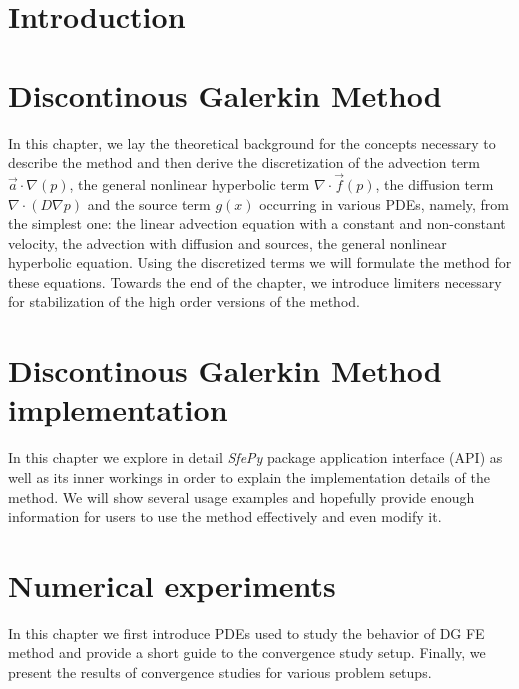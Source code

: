 \documentclass[openany]{book}
\providecommand{\sfepy}{\textit{SfePy}}
\theoremstyle{definition}
\numberwithin{equation}{section}
\numberwithin{table}{section}
\begin{document}
\chapter{Introduction}
\label{ch:introduction}


\chapter{Discontinous Galerkin Method}
\label{ch:theory}
In this chapter, we lay the theoretical background for the concepts necessary to
describe the method and then derive the discretization of the advection term
$\vec{a}\cdot\nabla(p)$, the general nonlinear hyperbolic term $\nabla\cdot
\vec{f}(p)$, the diffusion term $\nabla \cdot (D \nabla p)$ and the source term $g(x)$
occurring in various PDEs, namely, from the simplest one: the linear advection
equation with a constant and non-constant velocity, the advection with diffusion and
sources, the general nonlinear hyperbolic equation. Using the discretized terms we
will formulate the method for these equations. Towards the end of the chapter,
we introduce limiters necessary for stabilization of the high order versions
of the method.



\chapter{Discontinous Galerkin Method implementation}
\label{ch:implementation}
In this chapter we explore in detail \sfepy{} package application interface
(API) as well as its inner workings in order to explain the implementation
details of the method. We will show several usage examples and hopefully
provide enough information for users to use the method effectively and even
modify it.



\chapter{Numerical experiments}
\label{ch:convergence}
In this chapter we first introduce PDEs used to study the behavior of DG FE
method and provide a short guide to the convergence study setup. Finally, we
present the results of convergence studies for various problem setups.


\newpage

\newpage

\newpage

\newpage

\newpage

\newpage

\newpage

\newpage

\end{document}
